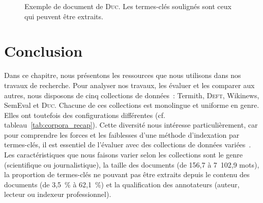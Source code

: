     \begin{figure}[!h]
      \caption[Exemple de document de \textsc{Duc}]{
        Exemple de document de \textsc{Duc}. Les termes-clés soulignés sont ceux
        qui peuvent être extraits.
        \label{fig:example_duc}
      }
    \end{figure}


  \section{Conclusion}
  \label{sec:main-data_description-conclusion}
    Dans ce chapitre, nous présentons les ressources que nous utilisons dans nos
    travaux de recherche. Pour analyser nos travaux, les évaluer et les comparer
    aux autres, nous disposons de cinq collections de données~: Termith,
    \textsc{Deft}, Wikinews, SemEval et \textsc{Duc}. Chacune de ces collections
    est monolingue et uniforme en genre. Elles ont toutefois des configurations
    différentes (cf. tableau~\ref{tab:corpora_recap}). Cette diversité nous
    intéresse particulièrement, car \og{}pour comprendre les forces et les
    faiblesses d'une méthode d'indexation par termes-clés, il est essentiel de
    l'évaluer avec des collections de données variées\fg{}~\cite{hassan2010conundrums}. Les
    caractéristiques que nous faisons varier selon les collections sont le genre
    (scientifique ou journalistique), la taille des documents (de 156,7 à
    7~102,9 mots), la proportion de termes-clés ne pouvant pas être extraits
    depuis le contenu des documents (de 3,5~\% à 62,1~\%) et la qualification
    des annotateurs (auteur, lecteur ou indexeur professionnel).

